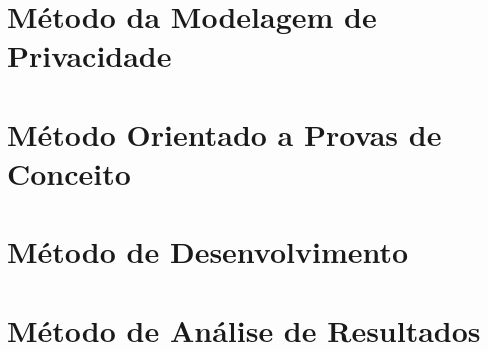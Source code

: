 
\section{Método da Modelagem de Privacidade}
\label{mtd-modelagem-privacidade}


\section{Método Orientado a Provas de Conceito}
\label{mtd-provas-conceito}


\section{Método de Desenvolvimento}
\label{mtd-desenvolvimento}


\section{Método de Análise de Resultados}
\label{mtd-analise-resultados}


